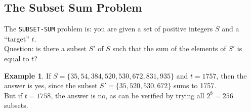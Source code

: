 \documentclass[12pt]{article}
\theoremstyle{plain}
\theoremstyle{definition}
\newtheorem*{ex*}{Example}
\begin{document}
\subsection{The Subset Sum Problem}
The \texttt{SUBSET-SUM} problem is: you are given a set of positive integers $S$ and a ``target'' $t$. \\
Question: is there a subset $S'$ of $S$ such that the sum of the elements of $S'$ is equal to $t$?

\begin{ex*}
If $S = \{35, 54, 384, 520, 530, 672, 831, 935\}$ and $t = 1757$, then the answer is yes, since the subset $S' = \{35, 520, 530, 672\}$ sums to 1757. \\
But if $t = 1758$, the answer is no, as can be verified by trying all $2^{8} = 256$ subsets.
\end{ex*}
\end{document}
